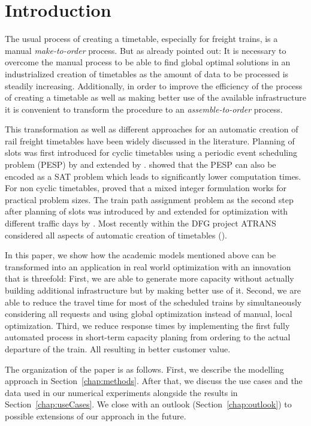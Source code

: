 \section{Introduction}
\label{chap:intro}
%
The usual process of creating a timetable, especially for freight trains, is a manual \emph{make-to-order} process. But as \cite{FP:2014} already pointed out: It is necessary to overcome the manual process to be able to find global optimal solutions in an industrialized creation of timetables as the amount of data to be processed is steadily increasing. Additionally, in order to improve the efficiency of the process of creating a timetable as well as making better use of the available infrastructure it is convenient to transform the procedure to an \emph{assemble-to-order} process.

This transformation as well as different approaches for an automatic creation of rail freight timetables have been widely discussed in the literature. Planning of slots was first introduced for cyclic timetables using a periodic event scheduling problem (PESP) by \cite{N:1998} and extended by \cite{O:2009}. \cite{G:2012} showed that the PESP can also be encoded as a SAT problem which leads to significantly lower computation times. For non cyclic timetables, \cite{G:2013} proved that a mixed integer formulation works for practical problem sizes. The train path assignment problem as the second step after planning of slots was introduced by \cite{NO:2014} and extended for optimization with different traffic days by \cite{N:2015}. Most recently within the DFG project ATRANS considered all aspects of automatic creation of timetables (\cite{RW, CS, XL}).

In this paper, we show how the academic models mentioned above can be transformed into an application in real world optimization with an innovation that is threefold: First, we are able to generate more capacity without actually building additional infrastructure but by making better use of it. Second, we are able to reduce the travel time for most of the scheduled trains by simultaneously considering all requests and using global optimization instead of manual, local optimization. Third, we reduce response times by implementing the first fully automated process in short-term capacity planing from ordering to the actual departure of the train. All resulting in better customer value.

The organization of the paper is as follows. First, we describe the modelling approach in Section~\ref{chap:methods}. After that, we discuss the use cases and the data used in our numerical experiments alongside the results in Section~\ref{chap:useCases}. We close with an outlook (Section~\ref{chap:outlook}) to possible extensions of our approach in the future.